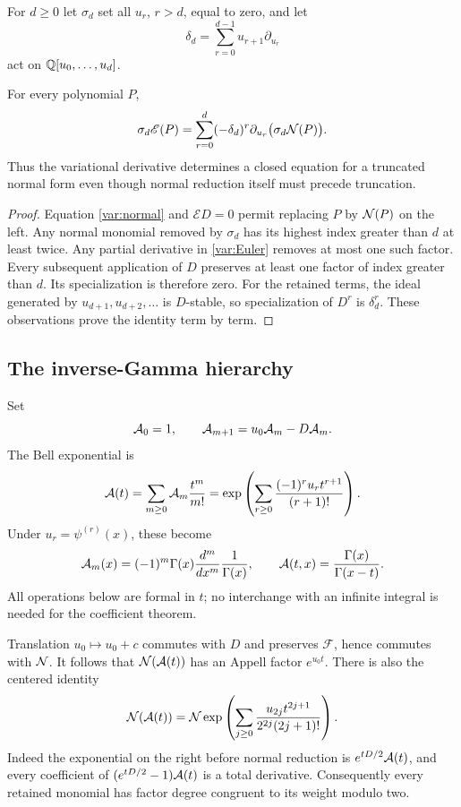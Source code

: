 For $d\ge0$ let $\sigma_d$ set all $u_r$, $r>d$, equal to zero,
and let
\[
 \delta_d=\sum_{r=0}^{d-1}u_{r+1}\partial_{u_r}
\]
act on $\mathbb Q[u_0,\ldots,u_d]$.

\begin{lemma}\label{var:finitejet}
For every polynomial $P$,
\begin{equation}\label{var:finitejet-eq}
 \sigma_d\mathscr E(P)=
 \sum_{r=0}^d(-\delta_d)^r
      \partial_{u_r}\bigl(\sigma_d\mathcal N(P)\bigr).
\end{equation}
Thus the variational derivative determines a closed equation for a
truncated normal form even though normal reduction itself must precede
truncation.
\end{lemma}
\begin{proof}
Equation \eqref{var:normal} and $\mathscr E D=0$ permit replacing
$P$ by $\mathcal N(P)$ on the left. Any normal monomial removed by
$\sigma_d$ has its highest index greater than $d$ at least twice.
Any partial derivative in \eqref{var:Euler} removes at most one such
factor. Every subsequent application of $D$ preserves at least one
factor of index greater than $d$. Its specialization is therefore zero.
For the retained terms, the ideal generated by $u_{d+1},u_{d+2},\ldots$
is $D$-stable, so specialization of $D^r$ is $\delta_d^r$.
These observations prove the identity term by term.
\end{proof}

\subsection{The inverse-Gamma hierarchy}

Set
\begin{equation}\label{var:hierarchy}
 \mathcal A_0=1,\qquad \mathcal A_{m+1}=u_0\mathcal A_m-D\mathcal A_m.
\end{equation}
The Bell exponential is
\begin{equation}\label{var:Bell}
 \mathcal A(t)=\sum_{m\ge0}\mathcal A_m\frac{t^m}{m!}
 =\exp\left(\sum_{r\ge0}
         \frac{(-1)^ru_rt^{r+1}}{(r+1)!}\right).
\end{equation}
Under $u_r=\psi^{(r)}(x)$, these become
\[
 \mathcal A_m(x)=(-1)^m\Gamma(x)\frac{d^m}{dx^m}\frac1{\Gamma(x)},
 \qquad \mathcal A(t,x)=\frac{\Gamma(x)}{\Gamma(x-t)}.
\]
All operations below are formal in $t$; no interchange with an
infinite integral is needed for the coefficient theorem.

Translation $u_0\mapsto u_0+c$ commutes with $D$ and preserves
$\mathscr F$, hence commutes with $\mathcal N$. It follows that
$\mathcal N(\mathcal A(t))$ has an Appell factor $e^{u_0t}$.
There is also the centered identity
\begin{equation}\label{var:centered}
 \mathcal N(\mathcal A(t))=
 \mathcal N\exp\left(\sum_{j\ge0}
          \frac{u_{2j}t^{2j+1}}{2^{2j}(2j+1)!}\right).
\end{equation}
Indeed the exponential on the right before normal reduction is
$e^{tD/2}\mathcal A(t)$, and every coefficient of
$(e^{tD/2}-1)\mathcal A(t)$ is a total derivative.
Consequently every retained monomial has factor degree congruent to
its weight modulo two.

